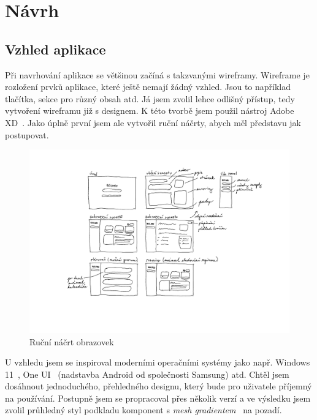 
\chapter{Návrh}

\section{Vzhled aplikace}

Při navrhování aplikace se většinou začíná s takzvanými wireframy. Wireframe je rozložení prvků aplikace, které ještě
nemají žádný vzhled. Jsou to například tlačítka, sekce pro různý obsah atd. Já jsem zvolil lehce odlišný přístup, tedy
vytvoření wireframu již s designem. K této tvorbě jsem použil nástroj Adobe XD~\cite{AdobeXD}. Jako úplně první jsem ale vytvořil
ruční náčrty, abych měl představu jak postupovat.

\begin{figure}[H]
    \includegraphics[width=\textwidth]{pdf/navrh-rucni}
    \caption{Ruční náčrt obrazovek} \label{picture:recipeo:hand-drawn-design}
\end{figure}

U vzhledu jsem se inspiroval moderními operačními systémy jako např. Windows 11~\cite{Windows11}, One UI~\cite{OneUI}
(nadstavba Android od společnosti Samsung) atd.
Chtěl jsem dosáhnout jednoduchého, přehledného designu, který bude pro uživatele příjemný na používání. Postupně jsem se
propracoval přes několik verzí a ve výsledku jsem zvolil průhledný styl podkladu komponent s \emph{mesh gradientem}~\cite{MeshGradients} na pozadí.

